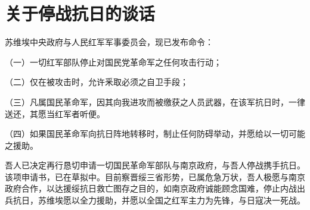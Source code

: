 \section[关于停战抗日的谈话（一九三六年十月十五日）]{关于停战抗日的谈话}


苏维埃中央政府与人民红军军事委员会，现已发布命令：

（一）一切红军部队停止对国民党革命军之任何攻击行动；

（二）仅在被攻击时，允许釆取必须之自卫手段；

（三）凡属国民革命军，因其向我进攻而被缴获之人员武器，在该军抗日时，一律送还，其愿当红军者听便。

（四）如果国民革命军向抗日阵地转移时，制止任何防碍举动，并愿给以一切可能之援助。

吾人已决定再行恳切申请一切国民革命军部队与南京政府，与吾人停战携手抗日。该项申请书，已在草拟中。目前察晋绥三省形势，已属危急万状，吾人极愿与南京政府合作，以达援绥抗日救亡图存之目的，如南京政府诚能顾念国难，停止内战出兵抗日，苏维埃愿以全力援助，并愿以全国之红军主力为先锋，与日寇决一死战。

